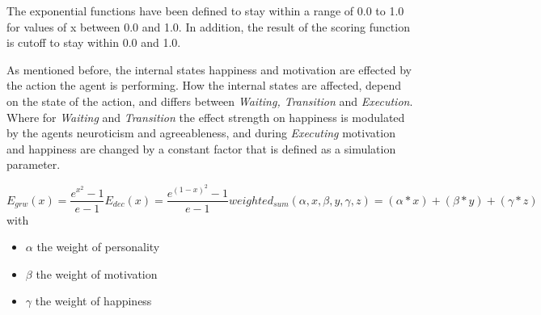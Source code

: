 The exponential functions have been defined to stay within a range of 0.0 to 1.0
for values of x between 0.0 and 1.0. In addition, the result of the scoring function
is cutoff to stay within 0.0 and 1.0.

\bb

As mentioned before, the internal states happiness and motivation are effected by
the action the agent is performing. How the internal states are affected, depend
on the state of the action, and differs between \textit{Waiting, Transition} and \textit{Execution}.
Where for \textit{Waiting} and \textit{Transition} the effect strength on happiness is modulated
by the agents neuroticism and agreeableness, and during \textit{Executing}
motivation and happiness are changed by a constant factor that is defined as a
simulation parameter.

\begin{subequations} 
\label{eq3}
\begin{equation}
    E_{grw}(x) =  \frac{e^{x^2}-1}{e - 1}
\end{equation}
\begin{equation}
    E_{dec}(x) =  \frac{e^{(1 - x)^2}-1}{e - 1}
\end{equation}
\begin{equation}
    weighted_{sum}(\alpha,x,\beta,y,\gamma,z) = (\alpha * x) + (\beta * y) + (\gamma * z)
\end{equation}
\end{subequations}
with
\begin{itemize}
    \item $\alpha$ the weight of personality
    \item $\beta$ the weight of motivation
    \item $\gamma$ the weight of happiness
\end{itemize}

\begin{figure}[!h]
    \label{Equatin_figures}
\end{figure}

